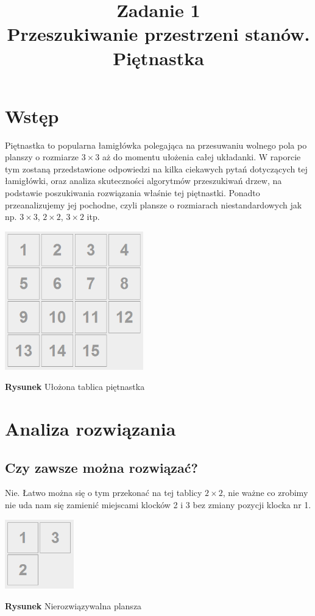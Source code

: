 \documentclass{classrep}
\author{
  \studentinfo{Natalia Mateuszuk}{203940} \and
  \studentinfo{Adrian Grzelak}{200242}
}
\title{Zadanie 1 \\
Przeszukiwanie przestrzeni stanów. Piętnastka}
\begin{document}
\maketitle

\section{Wstęp}
Piętnastka to popularna łamigłówka polegająca na przesuwaniu wolnego pola po planszy o rozmiarze $3 \times 3$ aż do momentu ułożenia całej układanki. W raporcie tym zostaną przedstawione odpowiedzi na kilka ciekawych pytań dotyczących tej łamigłówki, oraz analiza skuteczności algorytmów przeszukiwań drzew, na podstawie poszukiwania rozwiązania właśnie tej piętnastki. Ponadto przeanalizujemy jej pochodne, czyli plansze o rozmiarach niestandardowych jak np. $3 \times 3$, $2 \times 2$, $3 \times 2$ itp.

\begin{center}
	\includegraphics[height=6cm]{puzzle.png}
	
	\textbf{Rysunek} Ułożona tablica piętnastka
\end{center}

\section{Analiza rozwiązania}
\subsection{Czy zawsze można rozwiązać?}
Nie. Łatwo można się o tym przekonać na tej tablicy $2 \times 2$, nie ważne co zrobimy nie uda nam się zamienić miejscami klocków 2 i 3 bez zmiany pozycji klocka nr 1.
\begin{center}
	\includegraphics[height=3cm]{2x2unsolvable.png}
	
	\textbf{Rysunek} Nierozwiązywalna plansza
\end{center}
\end{document}
